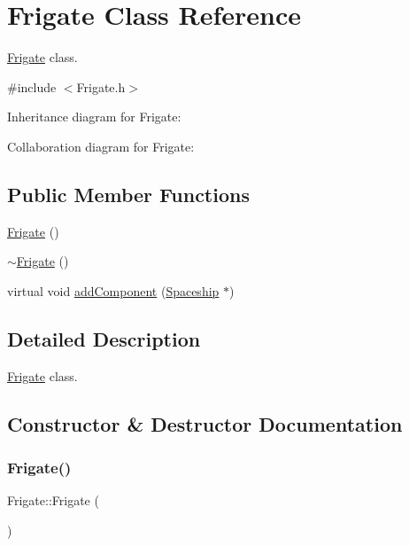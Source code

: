 \hypertarget{classFrigate}{}\section{Frigate Class Reference}
\label{classFrigate}


\hyperlink{classFrigate}{Frigate} class.  




{\ttfamily \#include $<$Frigate.\+h$>$}



Inheritance diagram for Frigate\+:


Collaboration diagram for Frigate\+:
\subsection*{Public Member Functions}
\begin{DoxyCompactItemize}
\item 
\hyperlink{classFrigate_ad68c1d421cc3872688a19727055632a2}{Frigate} ()
\item 
\hyperlink{classFrigate_a86559f40e7725443c89039ee623fab2b}{$\sim$\+Frigate} ()
\item 
virtual void \hyperlink{classFrigate_ae06208eed84e006385e4d337e1f04c7d}{add\+Component} (\hyperlink{classSpaceship}{Spaceship} $\ast$)
\end{DoxyCompactItemize}


\subsection{Detailed Description}
\hyperlink{classFrigate}{Frigate} class. 

\subsection{Constructor \& Destructor Documentation}
\mbox{\label{classFrigate_ad68c1d421cc3872688a19727055632a2}} 
\subsubsection{\texorpdfstring{Frigate()}{Frigate()}}
{\footnotesize\ttfamily Frigate\+::\+Frigate (\begin{DoxyParamCaption}{ }\end{DoxyParamCaption})\hspace{0.3cm}{\ttfamily [inline]}}

